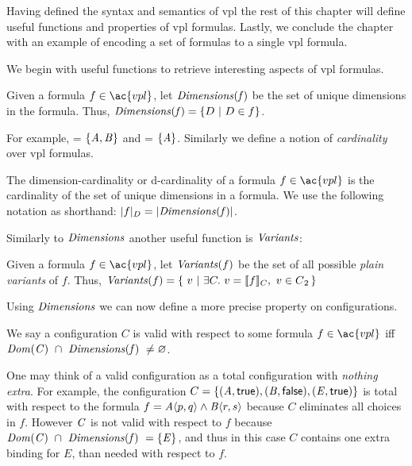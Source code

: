 %
Having defined the syntax and semantics of \ac{vpl} the rest of this chapter
will define useful functions and properties of \ac{vpl} formulas. Lastly, we
conclude the chapter with an example of encoding a set of \pl{} formulas to a
single \ac{vpl} formula.

We begin with useful functions to retrieve interesting aspects of \ac{vpl}
formulas.

\begin{definition}[Dimensions]
  Given a formula $f \in \ac{vpl}$, let $\mathit{Dimensions(f)}$ be the set of unique
  dimensions in the formula. Thus, $\mathit{Dimensions(f)} = \{ D\ |\ D \in f \}$.
\end{definition}

For example,  = $\{\mathit{A,B}\}$ and
 = $\{\mathit{A}\}$.
%
Similarly we define a notion of \emph{cardinality} over \ac{vpl} formulas.
%
\begin{definition}
  The dimension-cardinality or d-cardinality of a formula $f \in \ac{vpl}$ is
  the cardinality of the set of unique dimensions in a formula. We use the
  following notation as shorthand: $|f|_{D} = |{\mathit{Dimensions(f)}}|$.
\end{definition}

Similarly to $\mathit{Dimensions}$ another useful function is $\mathit{Variants}$:

\begin{definition}[Variants]
  Given a formula $f \in \ac{vpl}$, let $\mathit{Variants}(f)$ be the set of all
  possible \emph{plain variants} of $f$. Thus, $\variants{f} = \{\ v\ |\ \exists C.\
  v = \sem[C]{f},\ v \in \pl{} \,\}$
\end{definition}

Using $\mathit{Dimensions}$ we can now define a more precise property on
configurations.
%
\begin{definition}
  We say a configuration $C$ is valid with respect to some formula $f \in
  \ac{vpl}$ iff $\kf{Dom(C)}\ \cap\ \kf{Dimensions(\kf{f})\ \neq \varnothing}$.
\end{definition}

One may think of a valid configuration as a total configuration with
\emph{nothing extra}. For example, the configuration $C = \{\kf{(A,\true),
  (B,\false),(E,\true)}\}$ is total with respect to the formula $f =
\chc[A]{p,q}\wedge\chc[B]{r,s}$ because $C$ eliminates all choices in $f$.
However $\mathit{C}$ is not valid with respect to $f$ because $\mathit{Dom(C)}\ \cap\
\mathit{Dimensions(\mathit{f})\ = \{\mathit{E}\}}$, and thus in this case $C$ contains one
extra binding for $E$, than needed with respect to $f$.


